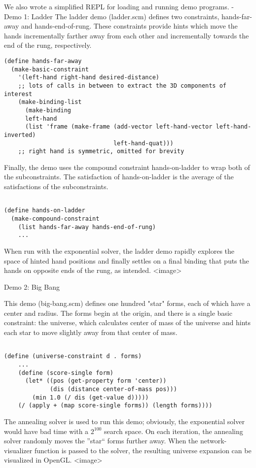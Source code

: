 \documentclass[12pt,a4paper]{article}
\begin{document}
We also wrote a simplified REPL for loading and running demo programs.
- Demo 1: Ladder
The ladder demo (ladder.scm) defines two constraints, hands-far-away and hands-end-of-rung. These constraints provide hints which move the hands incrementally farther away from each other and incrementally towards the end of the rung, respectively.  
\begin{lstlisting}
(define hands-far-away
  (make-basic-constraint
    '(left-hand right-hand desired-distance)
	;; lots of calls in between to extract the 3D components of interest
    (make-binding-list
      (make-binding
      left-hand
      (list 'frame (make-frame (add-vector left-hand-vector left-hand-inverted)
                               left-hand-quat)))
	;; right hand is symmetric, omitted for brevity
\end{lstlisting}

Finally, the demo uses the compound constraint hands-on-ladder to wrap both of the subconstraints. The satisfaction of hands-on-ladder is the average of the satisfactions of the subconstraints.
\begin{lstlisting}

(define hands-on-ladder
  (make-compound-constraint
    (list hands-far-away hands-end-of-rung)
	...
\end{lstlisting}

When run with the exponential solver, the ladder demo rapidly explores the space of hinted hand positions and finally settles on a final binding that puts the hands on opposite ends of the rung, as intended.
<image>

Demo 2: Big Bang

This demo (big-bang.scm) defines one hundred "star" forms, each of which have a center and radius. The forms begin at the origin, and there is a single basic constraint: the universe, which calculates center of mass of the universe and hints each star to move slightly away from that center of mass. 
\begin{lstlisting}

(define (universe-constraint d . forms)
    ...
    (define (score-single form)
      (let* ((pos (get-property form 'center))
             (dis (distance center-of-mass pos)))
        (min 1.0 (/ dis (get-value d)))))
    (/ (apply + (map score-single forms)) (length forms))))
\end{lstlisting}

The annealing solver is used to run this demo; obviously, the exponential solver would have bad time with a $2^{100}$ search space. On each iteration, the annealing solver randomly moves the ''star`` forms further away. When the network-visualizer function is passed to the solver, the resulting universe expansion can be visualized in OpenGL.
<image>
\end{document}
